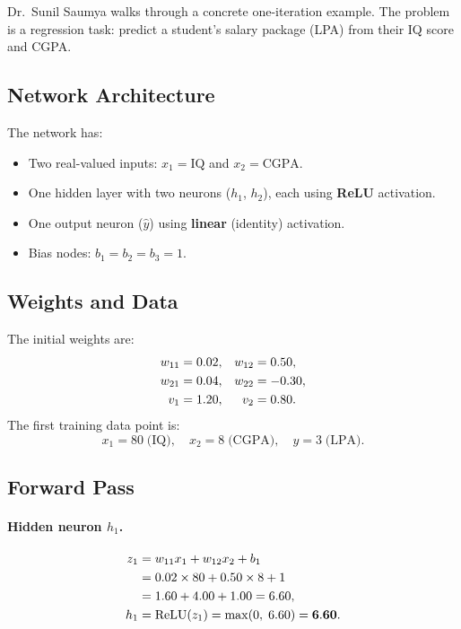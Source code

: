 \documentclass[12pt,a4paper]{article}
\newcommand{\yhat}{\hat{y}}
\begin{document}
Dr.~Sunil Saumya walks through a concrete one-iteration example.
The problem is a regression task: predict a student's salary package (LPA)
from their IQ score and CGPA.

\subsection{Network Architecture}
\label{subsec:example-arch}

The network has:
\begin{itemize}
  \item Two real-valued inputs: $x_1 = \text{IQ}$ and $x_2 = \text{CGPA}$.
  \item One hidden layer with two neurons ($h_1$, $h_2$), each using
    \textbf{ReLU} activation.
  \item One output neuron ($\yhat$) using \textbf{linear} (identity) activation.
  \item Bias nodes: $b_1 = b_2 = b_3 = 1$.
\end{itemize}

\subsection{Weights and Data}
\label{subsec:example-weights}

The initial weights are:
\begin{align}
  w_{11} &= 0.02, & w_{12} &= 0.50, \notag \\
  w_{21} &= 0.04, & w_{22} &= -0.30, \notag \\
  v_1    &= 1.20, & v_2    &= 0.80.
  \label{eq:init-weights}
\end{align}
The first training data point is:
\begin{equation}
  x_1 = 80 \;\text{(IQ)}, \quad x_2 = 8 \;\text{(CGPA)}, \quad y = 3 \;\text{(LPA)}.
  \label{eq:data-point}
\end{equation}

\subsection{Forward Pass}
\label{subsec:forward-pass}

\paragraph{Hidden neuron $h_1$.}
\begin{align}
  z_1 &= w_{11}x_1 + w_{12}x_2 + b_1 \notag \\
      &= 0.02 \times 80 + 0.50 \times 8 + 1 \notag \\
      &= 1.60 + 4.00 + 1.00 = 6.60, \\
  h_1 &= \mathrm{ReLU}(z_1) = \max(0,\;6.60) = \mathbf{6.60}.
  \label{eq:h1}
\end{align}
\end{document}
